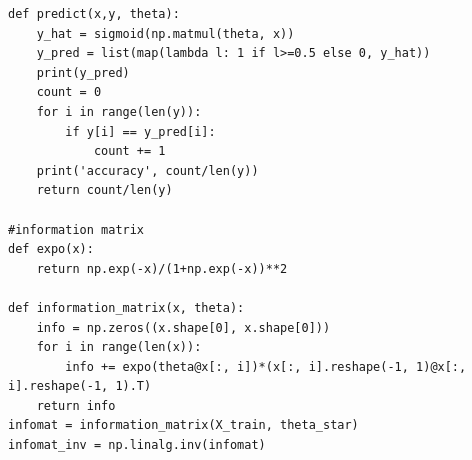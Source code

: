 \documentclass{article}
\begin{document}
\begin{lstlisting}
def predict(x,y, theta):     
    y_hat = sigmoid(np.matmul(theta, x))
    y_pred = list(map(lambda l: 1 if l>=0.5 else 0, y_hat))
    print(y_pred)
    count = 0
    for i in range(len(y)):
        if y[i] == y_pred[i]:
            count += 1
    print('accuracy', count/len(y))
    return count/len(y)

#information matrix
def expo(x):
    return np.exp(-x)/(1+np.exp(-x))**2

def information_matrix(x, theta):
    info = np.zeros((x.shape[0], x.shape[0]))
    for i in range(len(x)):
        info += expo(theta@x[:, i])*(x[:, i].reshape(-1, 1)@x[:, i].reshape(-1, 1).T)
    return info
infomat = information_matrix(X_train, theta_star)
infomat_inv = np.linalg.inv(infomat)
\end{lstlisting}
\end{document}
